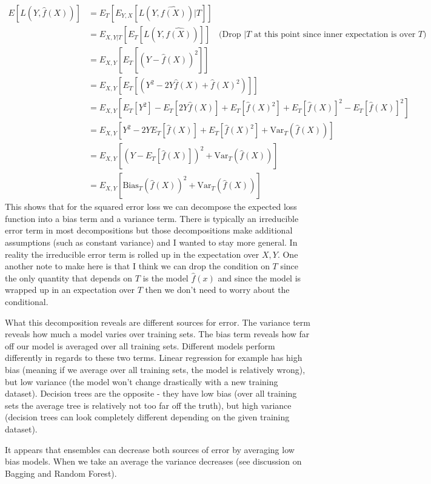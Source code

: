 \begin{equation}
\begin{split}
E[L(Y, \hat{f}(X))] & = E_{T}[E_{Y,X}[L(Y, \hat{f(X)})|T]] \\
&= E_{X,Y|T}[E_{T}[L(Y, \hat{f(X)})]]  \quad \text{(Drop $|T$ at this point since inner expectation is over $T$)}\\
&= E_{X,Y}[E_{T}[(Y - \hat{f}(X))^2]] \\
&= E_{X,Y}[E_{T}[(Y^2 - 2Y\hat{f}(X) + \hat{f}(X)^2)]] \\
&= E_{X,Y}[E_{T}[Y^2] - E_{T}[2Y\hat{f}(X)] + E_{T}[\hat{f}(X)^2] + E_{T}[\hat{f}(X)]^2 - E_{T}[\hat{f}(X)]^2]\\
&= E_{X,Y}[Y^2 -  2YE_{T}[\hat{f}(X)] + E_{T}[\hat{f}(X)^2] + \text{Var}_{T}(\hat{f}(X))]\\
&=E_{X,Y}[(Y - E_{T}[\hat{f}(X)])^2 + \text{Var}_{T}(\hat{f}(X))] \\
&= E_{X,Y}[\text{Bias}_{T}(\hat{f}(X))^2 + \text{Var}_{T}(\hat{f}(X))] 
\end{split}
\end{equation}
This shows that for the squared error loss we can decompose the expected loss function into a bias term and a variance term. There is typically an irreducible error term in most decompositions but those decompositions make additional assumptions (such as constant variance) and I wanted to stay more general. In reality the irreducible error term is rolled up in the expectation over $X,Y$. One another note to make here is that I think we can drop the condition on $T$ since the only quantity that depends on $T$ is the model $\hat{f}(x)$ and since the model is wrapped up in an expectation over $T$ then we don't need to worry about the conditional.

What this decomposition reveals are different sources for error. The variance term reveals how much a model varies over training sets. The bias term reveals how far off our model is averaged over all training sets. Different models perform differently in regards to these two terms. Linear regression for example has high bias (meaning if we average over all training sets, the model is relatively wrong), but low variance (the model won't change drastically with a new training dataset). Decision trees are the opposite - they have low bias (over all training sets the average tree is relatively not too far off the truth), but high variance (decision trees can look completely different depending on the given training dataset).

It appears that ensembles can decrease both sources of error by averaging low bias models. When we take an average the variance decreases (see discussion on Bagging and Random Forest).

